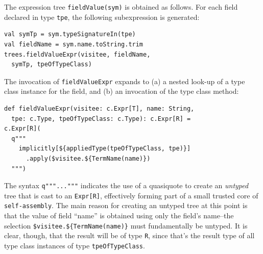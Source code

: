\documentclass[preprint,nocopyrightspace]{sigplanconf}
\newcommand{\sselfassembly}{\texttt{self-assembly}}
\begin{document}
The expression tree \verb|fieldValue(sym)| is obtained as follows. For
each field declared in type \verb|tpe|, the following subexpression is
generated:
\begin{lstlisting}
val symTp = sym.typeSignatureIn(tpe)
val fieldName = sym.name.toString.trim
trees.fieldValueExpr(visitee, fieldName,
  symTp, tpeOfTypeClass)
\end{lstlisting}

The invocation of \verb|fieldValueExpr| expands to (a) a nested look-up of a
type class instance for the field, and (b) an invocation of the type class
method:
\begin{lstlisting}
def fieldValueExpr(visitee: c.Expr[T], name: String,
  tpe: c.Type, tpeOfTypeClass: c.Type): c.Expr[R] =
c.Expr[R](
  q"""
    implicitly[${appliedType(tpeOfTypeClass, tpe)}]
      .apply($visitee.${TermName(name)})
  """)
\end{lstlisting}

The syntax \verb|q"""..."""| indicates the use of a quasiquote to create an
{\em untyped} tree that is cast to an \verb|Expr[R]|, effectively forming part
of a small trusted core of \sselfassembly. The main reason for creating an
untyped tree at this point is that the value of field ``name'' is obtained
using only the field's name--the selection \verb|$visitee.${TermName(name)}|
must fundamentally be untyped. It is clear, though, that the result will be of
type \verb|R|, since that's the result type of all type class instances of
type \verb|tpeOfTypeClass|.




\end{document}
